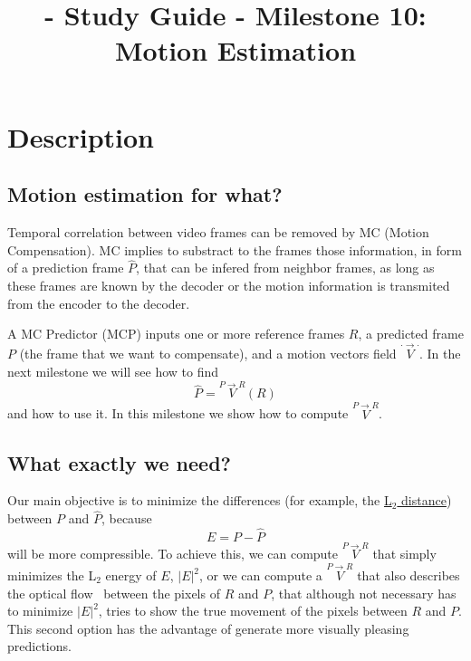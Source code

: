 
\title{\SM{} - Study Guide - Milestone 10: Motion Estimation}

\maketitle

\section{Description}

\subsection{Motion estimation for what?}
Temporal correlation between video frames can be removed by MC (Motion
Compensation). MC implies to substract to the frames those
information, in form of a prediction frame $\hat{P}$, that can be
infered from neighbor frames, as long as these frames are known by the
decoder or the motion information is transmited from the encoder to
the decoder.

A MC Predictor (MCP) inputs one or more reference frames $R$, a
predicted frame $P$ (the frame that we want to compensate), and a
motion vectors field $\overset{\cdot\rightarrow\cdot}{V}$. In the next
milestone we will see how to find
\begin{equation}
  \hat{P} =  \overset{P\rightarrow R}{V}(R)
\end{equation}
and how to use it. In this milestone we show how to compute
$\overset{P\rightarrow R}{V}$.

\subsection{What exactly we need?}
Our main objective is to minimize the differences (for example, the
\href{https://en.wikipedia.org/wiki/Euclidean_distance}{L$_2$
  distance}) between $P$ and $\hat{P}$, because
\begin{equation}
  E=P-\hat{P}
\end{equation}
will be more compressible. To achieve this, we can compute
$\overset{P\rightarrow R}{V}$ that simply minimizes the L$_2$ energy
of $E$, $|E|^2$, or we can compute a $\overset{P\rightarrow R}{V}$
that also describes the optical flow~\cite{horn1981determining}
between the pixels of $R$ and $P$, that although not necessary has to
minimize $|E|^2$, tries to show the true movement of the pixels
between $R$ and $P$. This second option has the advantage of generate
more visually pleasing predictions.

